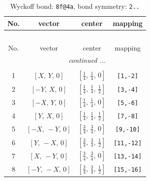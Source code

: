 \documentclass[fleqn,8pt]{jsarticle}
\begin{document}
\begin{longtable}{cccc}
\caption{Wyckoff bond: {\tt 8f@4a}, bond symmetry: {\tt 2..}}
 \\
 \hline \hline
No. & vector & center & mapping \\ \hline \endfirsthead

\multicolumn{3}{l}{\tablename\ \thetable{}} \\
 \hline \hline
No. & vector & center & mapping \\ \hline \endhead

 \hline \hline
\multicolumn{3}{r}{\footnotesize\it continued ...} \\ \endfoot

 \hline \hline
\multicolumn{3}{r}{} \\ \endlastfoot

1 & $\left[ X,\, Y,\, 0 \right]$ & $\left[ \frac{1}{4},\, \frac{1}{4},\, 0 \right]$ & {\tt [1,-2]} \\ \hline
2 & $\left[ - Y,\, X,\, 0 \right]$ & $\left[ \frac{1}{4},\, \frac{1}{4},\, \frac{1}{2} \right]$ & {\tt [3,-4]} \\ \hline
3 & $\left[ - X,\, Y,\, 0 \right]$ & $\left[ \frac{1}{4},\, \frac{1}{4},\, 0 \right]$ & {\tt [5,-6]} \\ \hline
4 & $\left[ Y,\, X,\, 0 \right]$ & $\left[ \frac{1}{4},\, \frac{1}{4},\, \frac{1}{2} \right]$ & {\tt [7,-8]} \\ \hline
5 & $\left[ - X,\, - Y,\, 0 \right]$ & $\left[ \frac{3}{4},\, \frac{3}{4},\, 0 \right]$ & {\tt [9,-10]} \\ \hline
6 & $\left[ Y,\, - X,\, 0 \right]$ & $\left[ \frac{3}{4},\, \frac{3}{4},\, \frac{1}{2} \right]$ & {\tt [11,-12]} \\ \hline
7 & $\left[ X,\, - Y,\, 0 \right]$ & $\left[ \frac{3}{4},\, \frac{3}{4},\, 0 \right]$ & {\tt [13,-14]} \\ \hline
8 & $\left[ - Y,\, - X,\, 0 \right]$ & $\left[ \frac{3}{4},\, \frac{3}{4},\, \frac{1}{2} \right]$ & {\tt [15,-16]} \\
\end{longtable}
\renewcommand{\arraystretch}{1.2}
\end{document}
